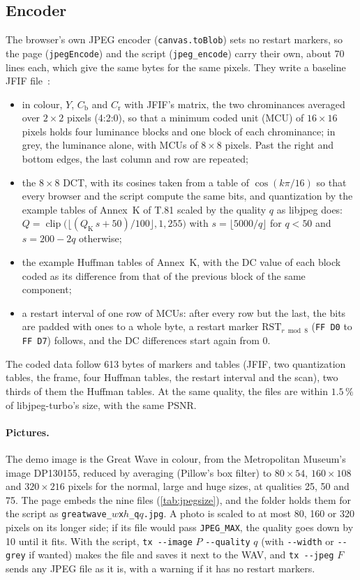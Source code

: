 \documentclass[11pt,a4paper]{article}
\newcommand{\clip}{\operatorname{clip}}
\newcommand{\code}[1]{\texttt{#1}}
\theoremstyle{remark}
\begin{document}
\subsection{Encoder}
\label{sec:jpegenc}
The browser's own JPEG encoder (\code{canvas.toBlob}) sets no restart markers, so the page (\code{jpegEncode}) and the script (\code{jpeg\_encode}) carry their own, about 70 lines each, which give the same bytes for the same pixels.
They write a baseline JFIF file~\cite{t81}:
\begin{itemize}
\item in colour, $Y$, $C_{\mathrm b}$ and $C_{\mathrm r}$ with JFIF's matrix, the two chrominances averaged over $2 \times 2$ pixels (4:2:0), so that a minimum coded unit (MCU) of $16 \times 16$ pixels holds four luminance blocks and one block of each chrominance; in grey, the luminance alone, with MCUs of $8 \times 8$ pixels. Past the right and bottom edges, the last column and row are repeated;
\item the $8 \times 8$ DCT, with its cosines taken from a table of $\cos(k\pi/16)$ so that every browser and the script compute the same bits, and quantization by the example tables of Annex~K of T.81 scaled by the quality $q$ as libjpeg does: $Q = \clip\bigl(\lfloor (Q_{\mathrm K}\, s + 50)/100 \rfloor, 1, 255\bigr)$ with $s = \lfloor 5000/q \rfloor$ for $q < 50$ and $s = 200 - 2q$ otherwise;
\item the example Huffman tables of Annex~K, with the DC value of each block coded as its difference from that of the previous block of the same component;
\item a restart interval of one row of MCUs: after every row but the last, the bits are padded with ones to a whole byte, a restart marker $\mathrm{RST}_{r \bmod 8}$ (\code{FF D0} to \code{FF D7}) follows, and the DC differences start again from 0.
\end{itemize}
The coded data follow 613 bytes of markers and tables (JFIF, two quantization tables, the frame, four Huffman tables, the restart interval and the scan), two thirds of them the Huffman tables.
At the same quality, the files are within $1.5\,\%$ of libjpeg-turbo's size, with the same PSNR.

\paragraph{Pictures.}
The demo image is the Great Wave in colour, from the Metropolitan Museum's image DP130155, reduced by averaging (Pillow's box filter) to $80 \times 54$, $160 \times 108$ and $320 \times 216$ pixels for the normal, large and huge sizes, at qualities 25, 50 and 75.
The page embeds the nine files (\cref{tab:jpegsize}), and the folder holds them for the script as \code{greatwave\_}$w$\code{x}$h$\code{\_q}$q$\code{.jpg}.
A photo is scaled to at most 80, 160 or 320 pixels on its longer side; if its file would pass \code{JPEG\_MAX}, the quality goes down by 10 until it fits.
With the script, \code{tx -{}-image} $P$ \code{-{}-quality} $q$ (with \code{-{}-width} or \code{-{}-grey} if wanted) makes the file and saves it next to the WAV, and \code{tx -{}-jpeg} $F$ sends any JPEG file as it is, with a warning if it has no restart markers.
\end{document}
